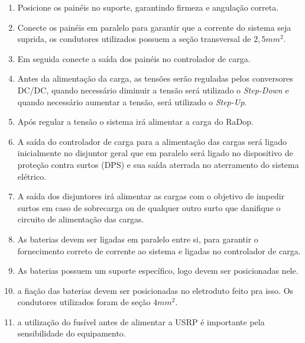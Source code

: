              \begin{enumerate}
                 \item Posicione os painéis no suporte, garantindo firmeza e angulação correta.
              
                 \item	Conecte os painéis em paralelo para garantir que a corrente do sistema seja suprida, os condutores utilizados possuem a seção transversal de $2,5 mm^2$.
                 
                 \item Em seguida conecte a saída dos painéis no controlador de carga.
                 
                  \item Antes da alimentação da carga, as tensões serão reguladas pelos conversores DC/DC, quando necessário diminuir a tensão será utilizado o \emph{Step-Down} e quando necessário aumentar a tensão, será utilizado o \emph{Step-Up}. 
                  
                 \item Após regular a tensão o sistema irá alimentar a carga do RaDop.
                 
                \item A saída do controlador de carga para a alimentação das cargas será ligado inicialmente no disjuntor geral que em paralelo será ligado no dispositivo de proteção contra surtos (DPS) e sua saída aterrada no aterramento do sistema elétrico.
                 
                 \item A saída dos disjuntores irá alimentar as cargas com o objetivo de impedir surtos em caso de sobrecarga ou de qualquer outro surto que danifique o circuito de alimentação das cargas.
                
                 \item As baterias devem ser ligadas em paralelo entre si, para garantir o fornecimento correto de corrente ao sistema e ligadas no controlador de carga.
                 
                 \item As baterias possuem um suporte específico, logo devem ser posicionadas nele.
                 
                 \item a fiação das baterias devem ser posicionadas no eletroduto feito pra isso. Os condutores utilizados foram de seção $ 4mm^2$.
                 
                 \item a utilização do fusível antes de alimentar a USRP é importante pela sensibilidade do equipamento.

             \end{enumerate}

